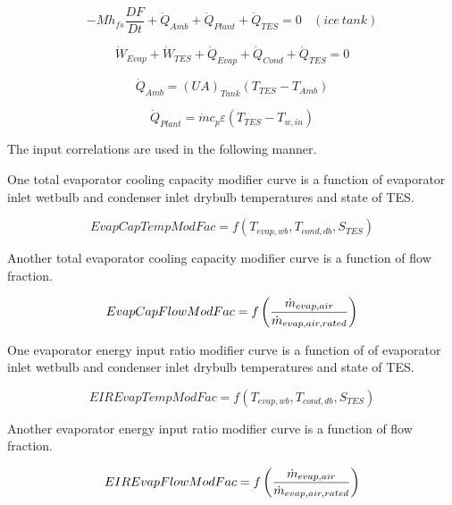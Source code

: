 \begin{equation}
-M{h_{fs}}\frac{{DF}}{{Dt}} + {\dot Q_{Amb}} + {\dot Q_{Plant}} + {\dot Q_{TES}} = 0 ~~~~ (ice~tank)
\end{equation}

\begin{equation}
{\dot W_{Evap}} + {\dot W_{TES}} + {\dot Q_{Evap}} + {\dot Q_{Cond}} + {\dot Q_{TES}} = 0
\end{equation}

\begin{equation}
{\dot Q_{Amb}} = {\left( {UA} \right)_{Tank}}\left( {{T_{TES}} - {T_{Amb}}} \right)
\end{equation}

\begin{equation}
  {\dot Q_{Plant}} = \dot m{c_p}\varepsilon \left( {{T_{TES}} - {T_{w,in}}} \right)
\end{equation}

The input correlations are used in the following manner.

One total evaporator cooling capacity modifier curve is a function of evaporator inlet wetbulb and condenser inlet drybulb temperatures and state of TES.

\begin{equation}
EvapCapTempModFac = f\left( {{T_{evap,wb}},{T_{cond,db}},{S_{TES}}} \right)
\end{equation}

Another total evaporator cooling capacity modifier curve is a function of flow fraction.

\begin{equation}
EvapCapFlowModFac = f\left(\frac{\dot{m}_{evap,air}}{\dot{m}_{evap,air,rated}}\right)
\end{equation}

One evaporator energy input ratio modifier curve is a function of of evaporator inlet wetbulb and condenser inlet drybulb temperatures and state of TES.

\begin{equation}
EIREvapTempModFac = f\left( {{T_{evap,wb}},{T_{cond,db}},{S_{TES}}} \right)
\end{equation}

Another evaporator energy input ratio modifier curve is a function of flow fraction.

\begin{equation}
EIREvapFlowModFac = f\left(\frac{\dot{m}_{evap,air}}{\dot{m}_{evap,air,rated}}\right)
\end{equation}

